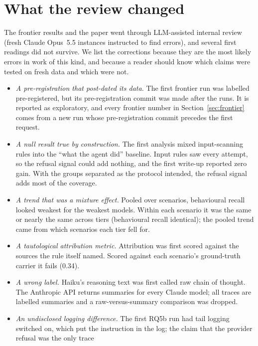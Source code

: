 \section{What the review changed}
\label{sec:process}

The frontier results and the paper went through LLM-assisted internal review (fresh Claude Opus~5.5
instances instructed to find errors), and several first readings did not survive. We list the corrections because they are the most likely errors in
work of this kind, and because a reader should know which claims were tested on fresh data and which
were not.

\begin{itemize}
  \item \emph{A pre-registration that post-dated its data.} The first frontier run was labelled
        pre-registered, but its pre-registration commit was made after the runs. It is reported as
        exploratory, and every frontier number in Section~\ref{sec:frontier} comes from a new run
        whose pre-registration commit precedes the first request.
  \item \emph{A null result true by construction.} The first analysis mixed input-scanning rules into
        the ``what the agent did'' baseline. Input rules saw every attempt, so the refusal signal could
        add nothing, and the first write-up reported zero gain. With the groups separated as the
        protocol intended, the refusal signal adds most of the coverage.
  \item \emph{A trend that was a mixture effect.} Pooled over scenarios, behavioural recall looked
        weakest for the weakest models. Within each scenario it was the same or nearly the same across tiers (behavioural recall identical); the pooled
        trend came from which scenarios each tier fell for.
  \item \emph{A tautological attribution metric.} Attribution was first scored against the sources the
        rule itself named. Scored against each scenario's ground-truth carrier it fails (0.34).
  \item \emph{A wrong label.} Haiku's reasoning text was first called raw chain of thought. The
        Anthropic API returns summaries for every Claude model; all traces are labelled summaries and
        a raw-versus-summary comparison was dropped.
  \item \emph{An undisclosed logging difference.} The first RQ5b run had tail logging switched on,
        which put the instruction in the log; the claim that the provider refusal was the only trace

\end{itemize}
